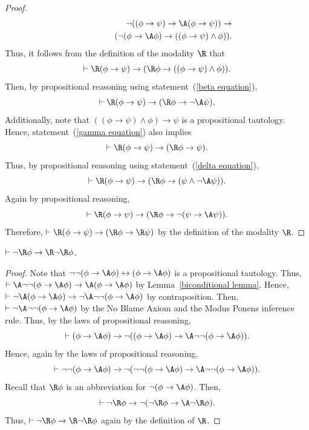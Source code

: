 \documentclass[letterpaper]{article}
\begin{document}
\begin{proof}
\begin{eqnarray*}
&&\neg((\phi\to\psi)\to\A(\phi\to\psi))\to\\
&&\hspace{10mm}(\neg(\phi\to\A\phi) \to ((\phi\to\psi)\wedge \phi)).
\end{eqnarray*}
Thus, it follows from the definition of the modality $\R$ that
\begin{equation}\label{gamma equation}
\vdash\R(\phi\to\psi)\to(\R\phi \to ((\phi\to\psi)\wedge \phi)).
\end{equation}
Then, by  propositional reasoning using statement~(\ref{beta equation}),
\begin{equation}\label{delta equation}
\vdash \R(\phi\to\psi)\to(\R\phi \to \neg\A\psi).
\end{equation}
Additionally, note that $((\phi\to\psi)\wedge \phi)\to\psi$ is a propositional tautology. Hence, statement~(\ref{gamma equation}) also implies
$$
\vdash\R(\phi\to\psi)\to(\R\phi \to \psi).
$$
Thus, by propositional reasoning using statement~(\ref{delta equation}),
$$
\vdash \R(\phi\to\psi)\to(\R\phi \to (\psi\wedge \neg\A\psi)).
$$
Again by propositional reasoning,
$$
\vdash \R(\phi\to\psi)\to(\R\phi \to \neg(\psi\to\A\psi)).
$$
Therefore, $\vdash\R(\phi\to\psi)\to(\R\phi\to\R\psi)$ by the definition of the modality $\R$.
\end{proof}



\begin{lemma}\label{negative introspection for R}
$\vdash\neg\R\phi\to\R\neg\R\phi$.
\end{lemma}
\begin{proof}
Note that $\neg\neg(\phi\to\A\phi)\leftrightarrow(\phi\to\A\phi)$ is a propositional tautology. Thus, $\vdash\A\neg\neg(\phi\to\A\phi)\to\A(\phi\to\A\phi)$ by Lemma~\ref{biconditional lemma}. Hence, $\vdash\neg\A(\phi\to\A\phi)\to \neg\A\neg\neg(\phi\to\A\phi)$ by contraposition. Then, $\vdash\neg\A\neg\neg(\phi\to\A\phi)$ by the No Blame Axiom and the Modus Ponens inference rule.
Thus, by the laws of propositional reasoning,
$$
\vdash (\phi\to\A\phi) \to \neg((\phi\to\A\phi) \to \A\neg\neg(\phi\to\A\phi)).
$$
Hence, again by the laws of propositional reasoning,
$$
\vdash \neg\neg(\phi\to\A\phi) \to \neg(\neg\neg(\phi\to\A\phi) \to \A\neg\neg(\phi\to\A\phi)).
$$
Recall that $\R\phi$ is an abbreviation for $\neg(\phi\to\A\phi)$. Then,
$$
\vdash \neg\R\phi \to \neg(\neg\R\phi \to \A\neg\R\phi).
$$
Thus, $\vdash\neg\R\phi\to\R\neg\R\phi$ again by the definition of $\R$.
\end{proof}
\end{document}

